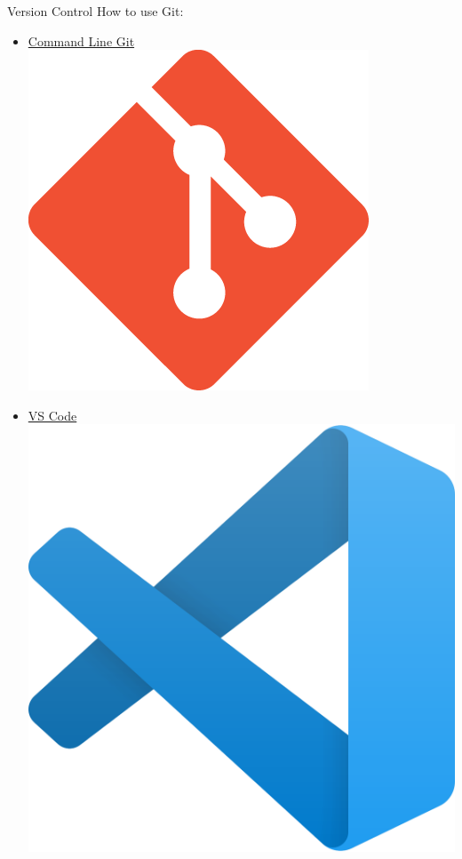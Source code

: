 \documentclass{beamer} %
\begin{document}
  \begin{frame}{Version Control}
    How to use Git:
    \begin{itemize}
      \item \href{https://git-scm.com/}{Command Line Git \includegraphics[height=.05\textheight]{git}}
      \item \href{https://code.visualstudio.com/}{VS Code \includegraphics[height=.05\textheight]{vscode}}

\end{itemize}
\end{frame}
\end{document}
